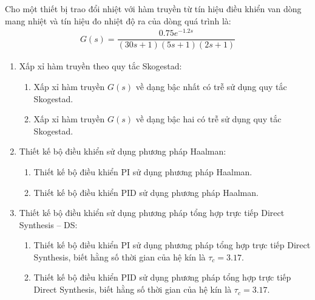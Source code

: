 \begin{exercise}
    Cho một thiết bị trao đổi nhiệt với hàm truyền từ tín hiệu điều khiển van dòng mang nhiệt và tín hiệu đo nhiệt độ ra của dòng quá trình là:
        \begin{align*}
            G(s) = \dfrac{0.75e^{-1.2s}}{(30s + 1)(5s + 1)(2s+1)}
        \end{align*}
    \begin{enumerate}
        \item Xấp xỉ hàm truyền theo quy tắc Skogestad:
            \begin{enumerate}
                \item Xấp xỉ hàm truyền $G(s)$ về dạng bậc nhất có trễ sử dụng quy tắc Skogestad.
                \item Xấp xỉ hàm truyền $G(s)$ về dạng bậc hai có trễ sử dụng quy tắc Skogestad.
            \end{enumerate}

        \item Thiết kế bộ điều khiển sử dụng phương pháp Haalman:
            \begin{enumerate}
                \item Thiết kế bộ điều khiển PI sử dụng phương pháp Haalman.
                \item Thiết kế bộ điều khiển PID sử dụng phương pháp Haalman.
            \end{enumerate}

        \item Thiết kế bộ điều khiển sử dụng phương pháp tổng hợp trực tiếp Direct Synthesis -- DS:
            \begin{enumerate}
                \item Thiết kế bộ điều khiển PI sử dụng phương pháp tổng hợp trực tiếp Direct Synthesis, biết hằng số thời gian của hệ kín là $\tau_c = 3.17$.

                \item Thiết kế bộ điều khiển PID sử dụng phương pháp tổng hợp trực tiếp Direct Synthesis, biết hằng số thời gian của hệ kín là $\tau_c = 3.17$.
            \end{enumerate}
    \end{enumerate}
\end{exercise}


